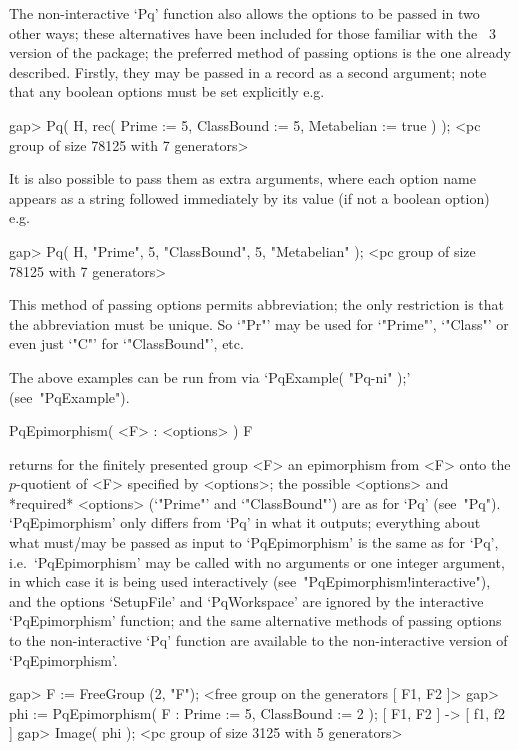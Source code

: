 The non-interactive `Pq' function also allows the options to be passed in
two other ways; these alternatives have been included for those  familiar
with the {\GAP}~3 version of the {\ANUPQ} package; the  preferred  method
of passing options is the one already described.  Firstly,  they  may  be
passed in a record as a second argument; note that  any  boolean  options
must be set explicitly e.g.

\beginexample
gap> Pq( H, rec( Prime := 5, ClassBound := 5, Metabelian := true ) );
<pc group of size 78125 with 7 generators>
\endexample

It is also possible to pass them as extra arguments,  where  each  option
name appears as a string followed immediately by  its  value  (if  not  a
boolean option) e.g.

\beginexample
gap> Pq( H, "Prime", 5, "ClassBound", 5, "Metabelian" );             
<pc group of size 78125 with 7 generators>
\endexample

This method of passing options permits abbreviation; the only restriction
is that the abbreviation must be  unique.  So  `"Pr"'  may  be  used  for
`"Prime"', `"Class"' or even just `"C"' for `"ClassBound"', etc.

The above examples can be run  from  {\GAP}  via  `PqExample( "Pq-ni" );'
(see~"PqExample").

\>PqEpimorphism( <F> : <options> ) F

returns for the finitely presented group <F> an epimorphism from <F> onto
the $p$-quotient of <F> specified by <options>;  the  possible  <options>
and *required* <options> (`"Prime"' and `"ClassBound"') are as  for  `Pq'
(see~"Pq"). `PqEpimorphism' only differs from `Pq' in  what  it  outputs;
everything about what must/may be passed as input to  `PqEpimorphism'  is
the same  as  for  `Pq',  i.e.~`PqEpimorphism'  may  be  called  with  no
arguments or one integer  argument,  in  which  case  it  is  being  used
interactively   (see~"PqEpimorphism!interactive"),   and   the    options
`SetupFile'  and   `PqWorkspace'   are   ignored   by   the   interactive
`PqEpimorphism' function; and the same  alternative  methods  of  passing
options to  the  non-interactive  `Pq'  function  are  available  to  the
non-interactive version of `PqEpimorphism'.

\beginexample
gap> F := FreeGroup (2, "F");
<free group on the generators [ F1, F2 ]>
gap> phi := PqEpimorphism( F : Prime := 5, ClassBound := 2 );
[ F1, F2 ] -> [ f1, f2 ]
gap> Image( phi );
<pc group of size 3125 with 5 generators>
\endexample

